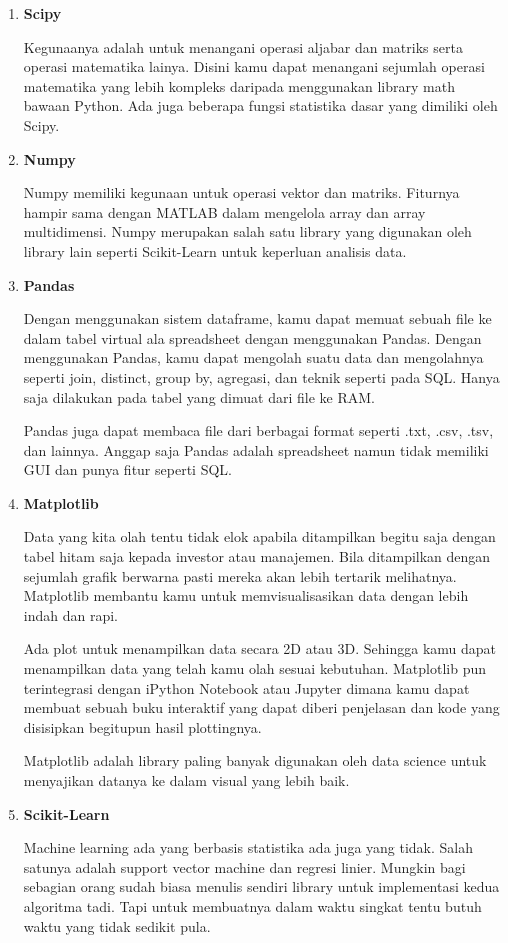 \begin{enumerate}
    \item \textbf{Scipy}
   \par Kegunaanya adalah untuk menangani operasi aljabar dan matriks serta operasi matematika lainya. Disini kamu dapat menangani sejumlah operasi matematika yang lebih kompleks daripada menggunakan library math bawaan Python. Ada juga beberapa fungsi statistika dasar yang dimiliki oleh Scipy.

\item \textbf{Numpy}
\par Numpy memiliki kegunaan untuk operasi vektor dan matriks. Fiturnya hampir sama dengan MATLAB dalam mengelola array dan array multidimensi. Numpy merupakan salah satu library yang digunakan oleh library lain seperti Scikit-Learn untuk keperluan analisis data.

\item \textbf{Pandas}
\par Dengan menggunakan sistem dataframe, kamu dapat memuat sebuah file ke dalam tabel virtual ala spreadsheet dengan menggunakan Pandas. Dengan menggunakan Pandas, kamu dapat mengolah suatu data dan mengolahnya seperti join, distinct, group by, agregasi, dan teknik seperti pada SQL. Hanya saja dilakukan pada tabel yang dimuat dari file ke RAM.

Pandas juga dapat membaca file dari berbagai format seperti .txt, .csv, .tsv, dan lainnya. Anggap saja Pandas adalah spreadsheet namun tidak memiliki GUI dan punya fitur seperti SQL.

\item \textbf{Matplotlib}
\par Data yang kita olah tentu tidak elok apabila ditampilkan begitu saja dengan tabel hitam saja kepada investor atau manajemen. Bila ditampilkan dengan sejumlah grafik berwarna pasti mereka akan lebih tertarik melihatnya. Matplotlib membantu kamu untuk memvisualisasikan data dengan lebih indah dan rapi.

Ada plot untuk menampilkan data secara 2D atau 3D. Sehingga kamu dapat menampilkan data yang telah kamu olah sesuai kebutuhan. Matplotlib pun terintegrasi dengan iPython Notebook atau Jupyter dimana kamu dapat membuat sebuah buku interaktif yang dapat diberi penjelasan dan kode yang disisipkan begitupun hasil plottingnya.

Matplotlib adalah library paling banyak digunakan oleh data science untuk menyajikan datanya ke dalam visual yang lebih baik.

\item \textbf{Scikit-Learn}
\par Machine learning ada yang berbasis statistika ada juga yang tidak. Salah satunya adalah support vector machine dan regresi linier. Mungkin bagi sebagian orang sudah biasa menulis sendiri library untuk implementasi kedua algoritma tadi. Tapi untuk membuatnya dalam waktu singkat tentu butuh waktu yang tidak sedikit pula.


\end{enumerate}
